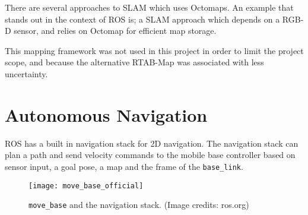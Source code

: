 There are several approaches to \ac{SLAM}  which uses Octomaps. An example that stands out in the context of \ac{ROS} is\cite{endres20143}; a \ac{SLAM} approach which depends on a RGB-D sensor, and relies on Octomap for efficient map storage.

This mapping framework was not used in this project in order to limit the project scope, and because the alternative \ac{RTAB-Map} was associated with less uncertainty.

\section{Autonomous Navigation}

\ac{ROS} has a built in navigation stack for 2D navigation. The navigation stack can plan a path and send velocity commands to the mobile base controller based on sensor input, a goal pose, a map and the frame of the \texttt{base\_link}.



\begin{figure}[h]
    \centering
    \texttt{[image: move\_base\_official]}
    \caption{\texttt{move\_base} and the navigation stack. (Image credits:  ros.org)}
    \label{fig:move_base_official}
\end{figure}
